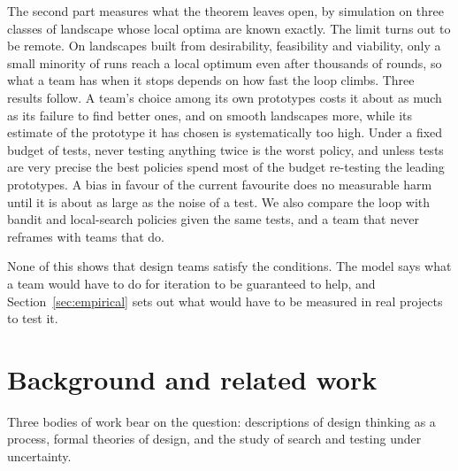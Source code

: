 \documentclass[10pt,twocolumn]{article}
\theoremstyle{definition}
\begin{document}
The second part measures what the theorem leaves open, by simulation on three classes of landscape whose local optima are known exactly. The limit turns out to be remote. On landscapes built from desirability, feasibility and viability, only a small minority of runs reach a local optimum even after thousands of rounds, so what a team has when it stops depends on how fast the loop climbs. Three results follow. A team's choice among its own prototypes costs it about as much as its failure to find better ones, and on smooth landscapes more, while its estimate of the prototype it has chosen is systematically too high. Under a fixed budget of tests, never testing anything twice is the worst policy, and unless tests are very precise the best policies spend most of the budget re-testing the leading prototypes. A bias in favour of the current favourite does no measurable harm until it is about as large as the noise of a test. We also compare the loop with bandit and local-search policies given the same tests, and a team that never reframes with teams that do.

None of this shows that design teams satisfy the conditions. The model says what a team would have to do for iteration to be guaranteed to help, and Section~\ref{sec:empirical} sets out what would have to be measured in real projects to test it.

\section{Background and related work}
\label{sec:related}

Three bodies of work bear on the question: descriptions of design thinking as a process, formal theories of design, and the study of search and testing under uncertainty.
\end{document}
